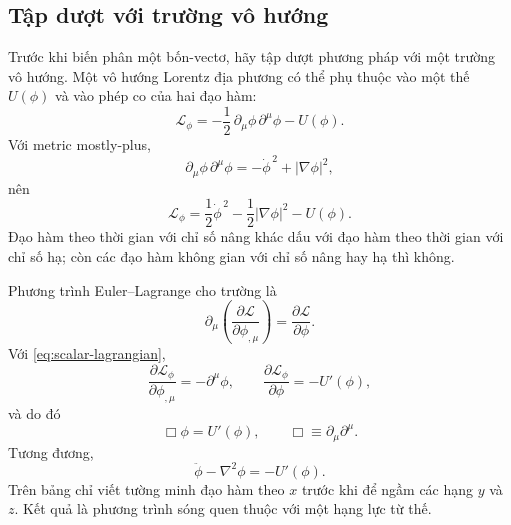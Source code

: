 \subsection{Tập dượt với trường vô hướng}

Trước khi biến phân một bốn-vectơ, hãy tập dượt phương pháp với một trường vô hướng. Một vô hướng Lorentz địa phương có thể phụ thuộc vào một thế \(U(\phi)\) và vào phép co của hai đạo hàm:
\begin{equation}
\mathcal L_\phi
=
-\frac12\,\partial_\mu\phi\,\partial^\mu\phi-U(\phi).
\label{eq:scalar-lagrangian}
\end{equation}
Với metric mostly-plus,
\begin{equation}
\partial_\mu\phi\,\partial^\mu\phi
=
-\dot\phi^{\,2}+|\nabla\phi|^2,
\end{equation}
nên
\begin{equation}
\mathcal L_\phi
=
\frac12\dot\phi^{\,2}
-\frac12|\nabla\phi|^2
-U(\phi).
\end{equation}
Đạo hàm theo thời gian với chỉ số nâng khác dấu với đạo hàm theo thời gian với chỉ số hạ; còn các đạo hàm không gian với chỉ số nâng hay hạ thì không.

\begin{classroomqa}
\end{classroomqa}

Phương trình Euler--Lagrange cho trường là
\begin{equation}
\partial_\mu\left(
\frac{\partial\mathcal L}{\partial\phi_{,\mu}}
\right)
=
\frac{\partial\mathcal L}{\partial\phi}.
\label{eq:field-el}
\end{equation}
Với \eqref{eq:scalar-lagrangian},
\begin{equation}
\frac{\partial\mathcal L_\phi}{\partial\phi_{,\mu}}
=
-\partial^\mu\phi,
\qquad
\frac{\partial\mathcal L_\phi}{\partial\phi}
=
-U'(\phi),
\end{equation}
và do đó
\begin{equation}
\Box\phi=U'(\phi),
\qquad
\Box\equiv\partial_\mu\partial^\mu.
\end{equation}
Tương đương,
\begin{equation}
\ddot\phi-\nabla^2\phi=-U'(\phi).
\label{eq:scalar-wave}
\end{equation}
Trên bảng chỉ viết tường minh đạo hàm theo \(x\) trước khi để ngầm các hạng \(y\) và \(z\). Kết quả là phương trình sóng quen thuộc với một hạng lực từ thế.

